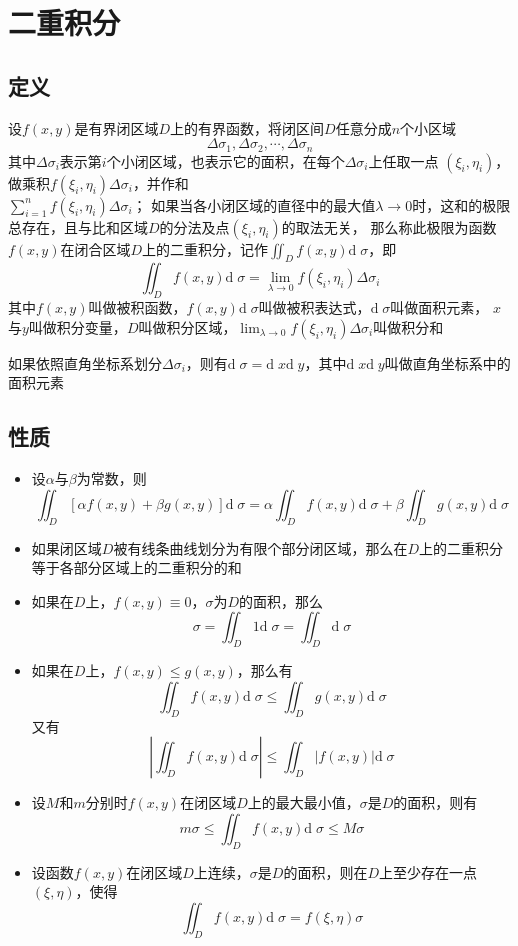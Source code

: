 \documentclass[UTF8]{ctexart}
\newcommand{\dif}[1]{{\text{d}\;\!#1}}
\newcommand{\abs}[1]{{\left|{#1}\right|}}
\begin{document}
\section*{二重积分}
\subsection*{定义}
设$f(x,y)$是有界闭区域$D$上的有界函数，将闭区间$D$任意分成$n$个小区域
\[\Delta \sigma_1,\Delta \sigma_2,\cdots,\Delta \sigma_n\]
其中$\Delta \sigma_i$表示第$i$个小闭区域，也表示它的面积，在每个$\Delta \sigma_i$上任取一点
$(\xi_i,\eta_i)$，做乘积$f(\xi_i,\eta_i)\Delta \sigma_i$，并作和\\
$\sum^n_{i=1}f(\xi_i,\eta_i)\Delta \sigma_i$；
如果当各小闭区域的直径中的最大值$\lambda\to0$时，这和的极限总存在，且与比和区域$D$的分法及点$(\xi_i,\eta_i)$的取法无关，
那么称此极限为函数$f(x,y)$在闭合区域$D$上的二重积分，记作$\displaystyle\iint_Df(x,y)\dif{\sigma}$，即
\[\iint_Df(x,y)\dif{\sigma}=\lim_{\lambda\to0}f(\xi_i,\eta_i)\Delta \sigma_i\]
其中$f(x,y)$叫做被积函数，$f(x,y)\dif{\sigma}$叫做被积表达式，$\dif{\sigma}$叫做面积元素，
$x$与$y$叫做积分变量，$D$叫做积分区域，$\lim_{\lambda\to0}f(\xi_i,\eta_i)\Delta \sigma_i$叫做积分和

如果依照直角坐标系划分$\Delta \sigma_i$，则有$\dif{\sigma}=\dif{x}\dif{y}$，其中$\dif{x}\dif{y}$叫做直角坐标系中的面积元素

\subsection*{性质}
\begin{itemize}
  \item 设$\alpha$与$\beta$为常数，则
  \[ \iint_D[\alpha f(x,y)+\beta g(x,y)]\dif{\sigma}=\alpha\iint_Df(x,y)\dif{\sigma}+\beta\iint_Dg(x,y)\dif{\sigma} \]

  \item 如果闭区域$D$被有线条曲线划分为有限个部分闭区域，那么在$D$上的二重积分等于各部分区域上的二重积分的和

  \item 如果在$D$上，$f(x,y)\equiv0$，$\sigma$为$D$的面积，那么
  \[ \sigma=\iint_D1\dif{\sigma}=\iint_D\dif{\sigma} \]

  \item 如果在$D$上，$f(x,y)\le g(x,y)$，那么有
  \[\iint_Df(x,y)\dif{\sigma}\le\iint_Dg(x,y)\dif{\sigma}\]
  又有
  \[\abs{\iint_Df(x,y)\dif{\sigma}}\le\iint_D\abs{f(x,y)}\dif{\sigma}\]

  \item 设$M$和$m$分别时$f(x,y)$在闭区域$D$上的最大最小值，$\sigma$是$D$的面积，则有
  \[m\sigma\le\iint_Df(x,y)\dif{\sigma}\le M\sigma\]

  \item 设函数$f(x,y)$在闭区域$D$上连续，$\sigma$是$D$的面积，则在$D$上至少存在一点$(\xi,\eta)$，使得
  \[\iint_Df(x,y)\dif{\sigma}=f(\xi,\eta)\sigma\]
\end{itemize}
\end{document}
